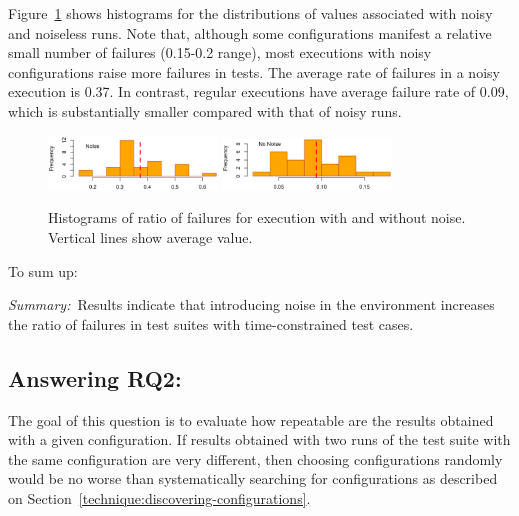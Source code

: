 \documentclass[conference]{IEEEtran}
\begin{document}
Figure~\ref{fig:historgram-random} shows histograms for the distributions of values associated with noisy and noiseless runs. Note that, although some configurations manifest a relative small number of failures (0.15-0.2 range), most executions with noisy configurations raise more failures in tests. The average rate of failures in a noisy execution is 0.37. In contrast, regular executions have average failure rate of 0.09, which is substantially smaller compared with that of noisy runs.
\begin{figure}[t!]
    \centering
    \includegraphics[width=0.4\textwidth]{figs/hist-failures-noise.eps}
    \includegraphics[width=0.4\textwidth]{figs/hist-failures-nonoise.eps}
    \vspace{-3ex}
    \caption{Histograms of ratio of failures for execution with and without noise. Vertical lines show average value.}
    \label{fig:historgram-random}
\end{figure}
To sum up: 
\begin{center}
\begin{tcolorbox}[enhanced,width=3.4in,center upper,drop shadow southwest,sharp corners]
\emph{Summary:}~Results indicate that introducing noise in the environment increases the ratio of failures in test suites with time-constrained test cases.
\end{tcolorbox}
\end{center}

\subsection{Answering RQ2: \rqtwo}
\label{sec:answer-rqtwo}

The goal of this question is to evaluate how repeatable are the results obtained with a given configuration. If results obtained with two runs of the test suite with the same configuration are very different, then choosing configurations randomly would be no worse than systematically searching for configurations as described on Section~\ref{technique:discovering-configurations}. 
\end{document}
